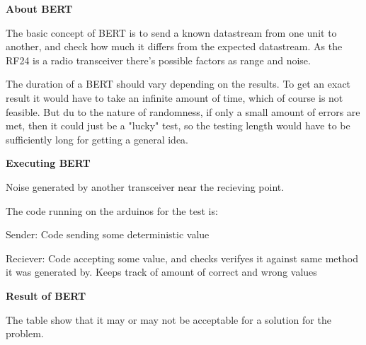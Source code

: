 \textbf{About BERT}

The basic concept of BERT is to send a known datastream from one unit to another, and check how much it differs from the expected datastream. As the RF24 is a radio transceiver there's possible factors as range and noise. 

The duration of a BERT should vary depending on the results. To get an exact result it would have to take an infinite amount of time, which of course is not feasible. But du to the nature of randomness, if only a small amount of errors are met, then it could just be a "lucky"  test, so the testing length would have to be sufficiently long for getting a general idea.

\textbf{Executing BERT} 

Noise generated by another transceiver near the recieving point.

The code running on the arduinos for the test is:

Sender:
Code sending some deterministic value

Reciever:
Code accepting some value, and checks verifyes it against same method it was generated by.
Keeps track of amount of correct and wrong values

\textbf{Result of BERT}


The table show that it may or may not be acceptable for a solution for the problem.

